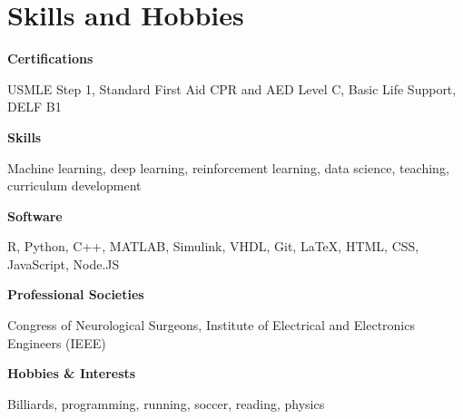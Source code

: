 \documentclass{article}
\begin{document}
\section*{\textcolor{my_colour}{Skills and Hobbies}}
\vspace{-.25em} \hrulefill \vspace{.25em}

\textbf{Certifications} \hfill \parbox[t]{.8\linewidth}{USMLE Step 1, Standard First Aid CPR and AED Level C, Basic Life Support, DELF B1}

\textbf{Skills} \hfill \parbox[t]{.8\linewidth}{Machine learning, deep learning, reinforcement learning, data science, teaching, curriculum development}

\textbf{Software} \hfill \parbox[t]{.8\linewidth}{R, Python, C++, MATLAB, Simulink, VHDL, Git, \LaTeX, HTML, CSS, JavaScript, Node.JS}

\textbf{Professional Societies} \hfill \parbox[t]{0.8\linewidth}{Congress of Neurological Surgeons, Institute of Electrical and Electronics Engineers (IEEE)}

\textbf{Hobbies \& Interests} \hfill \parbox[t]{.8\linewidth}{Billiards, programming, running, soccer, reading, physics}
\end{document}
